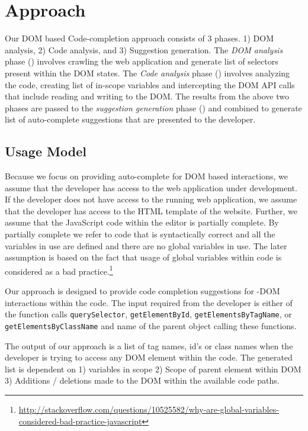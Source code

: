 \section{Approach}
\label{Sec:Approach}

	Our DOM based Code-completion approach consists of 3 phases. 1) DOM analysis, 2) Code analysis, and 3) Suggestion generation. The \emph{DOM analysis} phase () involves crawling the web application and generate list of \css selectors present within the DOM states. The \emph{Code analysis} phase () involves analyzing the \javascript code, creating list of in-scope variables and intercepting the DOM API calls that include reading and writing to the DOM. The results from the above two phases are passed to the \emph{suggestion generation} phase () and combined to generate list of auto-complete suggestions that are presented to the developer.
	
	\subsection{Usage Model}
	\label{Sec:Model}
		Because we focus on providing auto-complete for DOM based interactions, we assume that the developer has access to the web application under development. If the developer does not have access to the running web application, we assume that the developer has access to the HTML template of the website. Further, we assume that the JavaScript code within the editor is partially complete. By partially complete we refer to \javascript code that is syntactically correct and all the variables in use are defined and there are no global variables in use. The later assumption is based on the fact that usage of global variables within \javascript code is considered as a bad practice.\footnote{\url{http://stackoverflow.com/questions/10525582/why-are-global-variables-considered-bad-practice-javascript}}
		
		Our approach is designed to provide code completion suggestions for \javascript-DOM interactions within the \javascript code. The input required from the developer is either of the function calls \texttt{querySelector}, \texttt{getElementById}, \texttt{getElementsByTagName}, or \texttt{getElementsByClassName} and name of the parent object calling these functions.
	
	
		The output of our approach is a list of tag names, id's or class names when the developer is trying to access any DOM element within the \javascript code. The generated list is dependent on 1) \javascript variables in scope 2) Scope of parent element within DOM 3) Additions / deletions made to the DOM within the available code paths.
	
